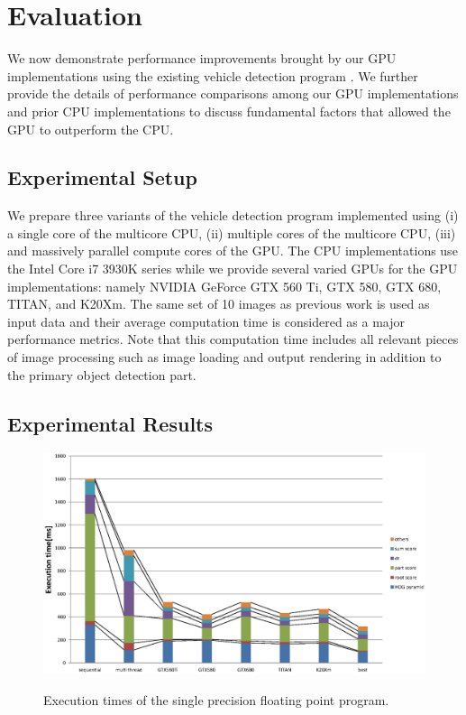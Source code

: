 \section{Evaluation}
\label{sec:evaluation}

We now demonstrate performance improvements brought by our GPU
implementations using the existing vehicle detection program
\cite{Niknejad12}.
We further provide the details of performance comparisons among our GPU
implementations and prior CPU implementations to discuss fundamental
factors that allowed the GPU to outperform the CPU.

\subsection{Experimental Setup}
\label{sec:setup}

We prepare three variants of the vehicle detection program implemented
using (i) a single core of the multicore CPU, (ii) multiple cores of the
multicore CPU, (iii) and massively parallel compute cores of the GPU.
The CPU implementations use the Intel Core i7 3930K series while we
provide several varied GPUs for the GPU implementations: namely NVIDIA
GeForce GTX 560 Ti, GTX 580, GTX 680, TITAN, and K20Xm.
The same set of 10 images as previous work \cite{Niknejad12} is used as
input data and their average computation time is considered as a major
performance metrics.
Note that this computation time includes all relevant pieces of image
processing such as image loading and output rendering in addition to the
primary object detection part.

\subsection{Experimental Results}
\label{sec:results}

\begin{figure}[t]
 \begin{center}
  \includegraphics[width=\hsize]{fig/float_exe_time.eps}\\
  \caption{Execution times of the single precision floating point program.}
  \label{fig:float_exe_time}
 \end{center}
\end{figure}

